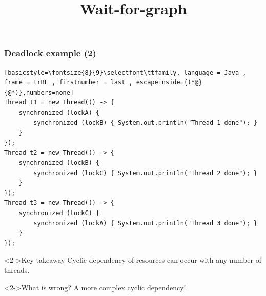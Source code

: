 \documentclass[xcolor={dvipsnames,svgnames},aspectratio=169]{beamer}
\begin{document}
\begin{frame}[fragile]
  \frametitle{\faSkull \quad Deadlock example (2)}

\begin{lstlisting}[basicstyle=\fontsize{8}{9}\selectfont\ttfamily, language = Java ,
frame = trBL , firstnumber = last , escapeinside={(*@}{@*)},numbers=none]
Thread t1 = new Thread(() -> {
    synchronized (lockA) {
        synchronized (lockB) { System.out.println("Thread 1 done"); }
    }
});
Thread t2 = new Thread(() -> {
    synchronized (lockB) {
        synchronized (lockC) { System.out.println("Thread 2 done"); }
    }
});
Thread t3 = new Thread(() -> {
    synchronized (lockC) {
        synchronized (lockA) { System.out.println("Thread 3 done"); }
    }
});
\end{lstlisting}

  \begin{block}<2->{\faLightbulb \quad Key takeaway}
    Cyclic dependency of resources can occur with any number of threads.
  \end{block}
\end{frame}

\begin{frame}[fragile]
  \title{Wait-for-graph}

  \begin{center}
  \end{center}

  \begin{block}<2->{\faPuzzlePiece \quad What is wrong?}
    A more complex cyclic dependency!
  \end{block}

\end{frame}
\end{document}
